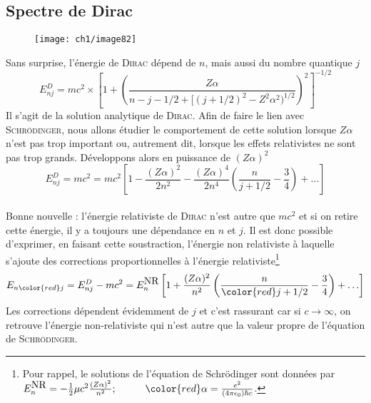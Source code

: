 \subsection{Spectre de Dirac}
	\begin{wrapfigure}[14]{l}{6cm}
	\vspace{-5mm}
	\texttt{[image: ch1/image82]}
	\end{wrapfigure}
	
Sans surprise, l'énergie de \textsc{Dirac} dépend de $n$, mais aussi du nombre quantique $j$
\begin{equation}
E_{nj}^D = mc^2\times \left[ 1 + 
\left(
\frac{Z \alpha} {n-j-1/2 + [(j+1/2)^2 - Z^2 \alpha^2)^{1/2}}
\right) ^2  \right] ^{-1/2}
\end{equation}
Il s'agit de la solution analytique de \textsc{Dirac}. Afin de faire le lien avec 
\textsc{Schrödinger}, nous allons étudier le comportement de cette solution lorsque $Z\alpha$ n'est
pas trop important ou, autrement dit, lorsque les effets relativistes ne sont pas trop grands. 
Développons alors en puissance de $(Z\alpha)^2$
\begin{equation}
E_{nj}^D = mc^2= mc^2 \left[
1 - \frac{(Z \alpha)^2}{2 n^2} 
- \frac{(Z \alpha)^4}{2n^4} \left(
\frac{n}{j+1/2} - \frac{3}{4} \right) + \ldots \right]
\end{equation}\ \\
Bonne nouvelle : l'énergie relativiste de \textsc{Dirac} n'est autre que $mc^2$ et si on retire cette
énergie, il y a toujours une dépendance en $n$ et $j$. Il est donc possible d'exprimer, en faisant
cette soustraction, l'énergie non relativiste à laquelle s'ajoute des corrections proportionnelles
à l'énergie relativiste\footnote{Pour rappel, le solutions de l'équation de Schrödinger sont 
données par $E_n^{\mbox{NR}} =
- \frac{1}{2} \mu c^2 \frac{(Z \alpha)^2}{n^2} ; \hspace*{1cm}
{\color{red} \alpha = \frac{e^2}{(4 \pi \epsilon_0) 
\hbar c}}$.}
\begin{equation}
E_{n {\color{red} j}} = E^D_{nj} - mc^2 = E_n^{\mbox{NR}} \left[
1 + \frac{(Z \alpha)^2}{n^2} \left(
\frac{n}{{\color{red} j}+1/2} - \frac{3}{4} \right) + \ldots \right]
\end{equation}
Les corrections dépendent évidemment de $j$ et c'est rassurant car si $c\to \infty$, on retrouve
l'énergie non-relativiste qui n'est autre que la valeur propre de l'équation de \textsc{Schrödinger}.


